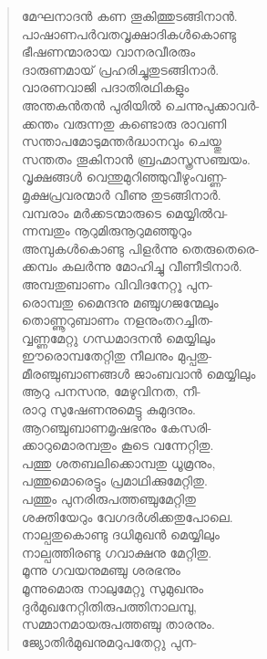 \begin{verse}
മേഘനാദന്‍ കണ തൂകിത്തുടങ്ങിനാന്‍.\\
പാഷാണപര്‍വതവൃക്ഷാദികള്‍കൊണ്ടു\\
ഭീഷണന്മാരായ വാനരവീരരും\\
ദാരുണമായ് പ്രഹരിച്ചുതുടങ്ങിനാര്‍.\\
വാരണവാജി പദാതിരഥികളും\\
അന്തകന്‍തന്‍ പുരിയില്‍ ചെന്നുപുക്കാവര്‍-\\
ക്കന്തം വരുന്നതു കണ്ടൊരു രാവണി\\
സന്താപമോടുമന്തര്‍ദ്ധാനവും ചെയ്തു\\
സന്തതം തൂകിനാന്‍ ബ്രഹ്മാസ്ത്രസഞ്ചയം.\\
വൃക്ഷങ്ങള്‍ വെന്തുമുറിഞ്ഞുവീഴുംവണ്ണ-\\
മൃക്ഷപ്രവരന്മാര്‍ വീണു തുടങ്ങിനാര്‍.\\
വമ്പരാം മര്‍ക്കടന്മാരുടെ മെയ്യില്‍വ-\\
ന്നമ്പതും നൂറുമിരുനൂറുമഞ്ഞൂറും\\
അമ്പുകള്‍കൊണ്ടു പിളര്‍ന്നു തെരുതെരെ-\\
ക്കമ്പം കലര്‍ന്നു മോഹിച്ചു വീണീടിനാര്‍.\\
അമ്പതുബാണം വിവിദനേറ്റൂ പുന-\\
രൊമ്പതു മൈന്ദനു മഞ്ചുഗജന്മേലും\\
തൊണ്ണൂറുബാണം നളനുംതറച്ചിത-\\
വ്വണ്ണമേറ്റു ഗന്ധമാദനന്‍ മെയ്യിലും\\
ഈരൊമ്പതേറ്റിതു നീലനും മുപ്പതു-\\
മീരഞ്ചുബാണങ്ങള്‍ ജാംബവാന്‍ മെയ്യിലും\\
ആറു പനസനു, മേഴുവിനത, നീ-\\
രാറു സുഷേണനുമെട്ടു കുമുദനും.\\
ആറഞ്ചുബാണമൃഷഭനും കേസരി-\\
ക്കാറുമൊരമ്പതും കൂടെ വന്നേറ്റിതു.\\
പത്തു ശതബലിക്കൊമ്പതു ധൂമ്രനും,\\
പത്തുമൊരെട്ടും പ്രമാഥിക്കുമേറ്റിതു.\\
പത്തും പുനരിരുപത്തഞ്ചുമേറ്റിതു\\
ശക്തിയേറും വേഗദര്‍ശിക്കതുപോലെ.\\
നാല്പതുകൊണ്ടു ദധിമുഖന്‍ മെയ്യിലും\\
നാല്പത്തിരണ്ടു ഗവാക്ഷനു മേറ്റിതു.\\
മൂന്നു ഗവയനുമഞ്ചു ശരഭനും\\
മൂന്നുമൊരു നാലുമേറ്റൂ സുമുഖനും\\
ദുര്‍മുഖനേറ്റിതിരുപത്തിനാലമ്പു,\\
സമ്മാനമായരുപത്തഞ്ചു താരനും.\\
ജ്യോതിര്‍മുഖനുമറുപതേറ്റു പുന-\\

\end{verse}
